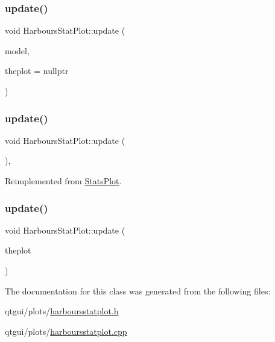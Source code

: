 \mbox{\label{class_harbours_stat_plot_ad75641b6f29ff3a585c3c47af2c4e758}} 
\subsubsection{\texorpdfstring{update()}{update()}\hspace{0.1cm}{\footnotesize\ttfamily [1/3]}}
{\footnotesize\ttfamily void Harbours\+Stat\+Plot\+::update (\begin{DoxyParamCaption}\item[{\mbox{\hyperlink{class_displace_model}{Displace\+Model}} $\ast$}]{model,  }\item[{\mbox{\hyperlink{class_q_custom_plot}{Q\+Custom\+Plot}} $\ast$}]{theplot = {\ttfamily nullptr} }\end{DoxyParamCaption})}

\mbox{\label{class_harbours_stat_plot_a98ae9cd6fbf5089f6fc7edabf2912606}} 
\subsubsection{\texorpdfstring{update()}{update()}\hspace{0.1cm}{\footnotesize\ttfamily [2/3]}}
{\footnotesize\ttfamily void Harbours\+Stat\+Plot\+::update (\begin{DoxyParamCaption}{ }\end{DoxyParamCaption})\hspace{0.3cm}{\ttfamily [override]}, {\ttfamily [virtual]}}



Reimplemented from \mbox{\hyperlink{class_stats_plot_a289e6689c9d7104f730b8d5abfc44646}{Stats\+Plot}}.

\mbox{\label{class_harbours_stat_plot_a0d016dd1f2ed1c70f7d49b7210e66041}} 
\subsubsection{\texorpdfstring{update()}{update()}\hspace{0.1cm}{\footnotesize\ttfamily [3/3]}}
{\footnotesize\ttfamily void Harbours\+Stat\+Plot\+::update (\begin{DoxyParamCaption}\item[{\mbox{\hyperlink{class_q_custom_plot}{Q\+Custom\+Plot}} $\ast$}]{theplot }\end{DoxyParamCaption})\hspace{0.3cm}{\ttfamily [protected]}}



The documentation for this class was generated from the following files\+:\begin{DoxyCompactItemize}
\item 
qtgui/plots/\mbox{\hyperlink{harboursstatplot_8h}{harboursstatplot.\+h}}\item 
qtgui/plots/\mbox{\hyperlink{harboursstatplot_8cpp}{harboursstatplot.\+cpp}}\end{DoxyCompactItemize}
